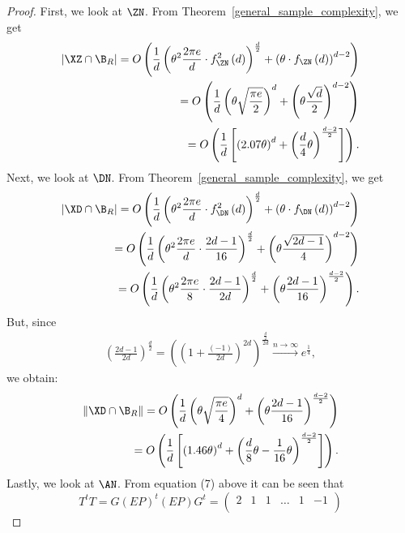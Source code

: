 \begin{proof}
    First, we look at $\ZN$. From Theorem~\ref{general_sample_complexity}, we get
    \begin{align*}
        |\XZ\cap \B_R| = O\left(\frac{1}{d}\left(\theta^2\frac{2\pi e}{d}\cdot f_{\ZN}^2\left(d\right)\right)^{\frac{d}{2}} + \left(\theta\cdot f_{\ZN}\left(d\right)\right)^{d-2}\right) \\
        = O\left(\frac{1}{d}\left(\theta\sqrt{\frac{\pi e}{2}}\right)^d+\left(\theta\frac{\sqrt{d}}{2}\right)^{d-2}\right)\\
        = O\left(\frac{1}{d}\left[\left(2.07\theta\right)^d+\left(\frac{d}{4}\theta\right)^\frac{d-2}{2}\right]\right).
    \end{align*}
    Next, we look at $\DN$. From Theorem~\ref{general_sample_complexity}, we get
    \begin{align*}
        |\XD\cap \B_R| = O\left(\frac{1}{d}\left(\theta^2\frac{2\pi e}{d}\cdot f_{\DN}^2\left(d\right)\right)^{\frac{d}{2}} + \left(\theta\cdot f_{\DN}\left(d\right)\right)^{d-2}\right) \\
        = O\left(\frac{1}{d}\left(\theta^2\frac{2\pi e}{d}\cdot \frac{2d-1}{16}\right)^{\frac{d}{2}}+\left(\theta\frac{\sqrt{2d-1}}{4}\right)^{d-2}\right)\\
        =O\left(\frac{1}{d}\left(\theta^2\frac{2\pi e}{8}\cdot \frac{2d-1}{2d}\right)^{\frac{d}{2}}+\left(\theta\frac{2d-1}{16}\right)^{\frac{d-2}{2}}\right).
    \end{align*}
    But, since
    \begin{align*}
        \left(\frac{2d-1}{2d}\right)^\frac{d}{2}=\left(\left(1+\frac{\left(-1\right)}{2d}\right)^{2d}\right)^\frac{\frac{d}{2}}{2d}\overset{n\rightarrow\infty}{\longrightarrow} e^{\frac{1}{4}},
    \end{align*}
    we obtain:
    \begin{align*}
         \|\XD\cap \B_R\|=O\left(\frac{1}{d}\left(\theta\sqrt{\frac{\pi e}{4}}\right)^d+\left(\theta\frac{2d-1}{16}\right)^{\frac{d-2}{2}}\right)\\
         = O\left(\frac{1}{d}\left[\left(1.46\theta\right)^d + \left(\frac{d}{8}\theta - \frac{1}{16}\theta\right)^\frac{d-2}{2}\right]\right).
    \end{align*}
    Lastly, we look at $\AN$. From equation (7) above it can be seen that
    \[
        T^tT=G\left(EP\right)^t\left(EP\right)G^t=
        \begin{pmatrix}
            2 & 1 &  1  & \dots & 1 & -1 \\

\end{pmatrix}\]
\end{proof}
